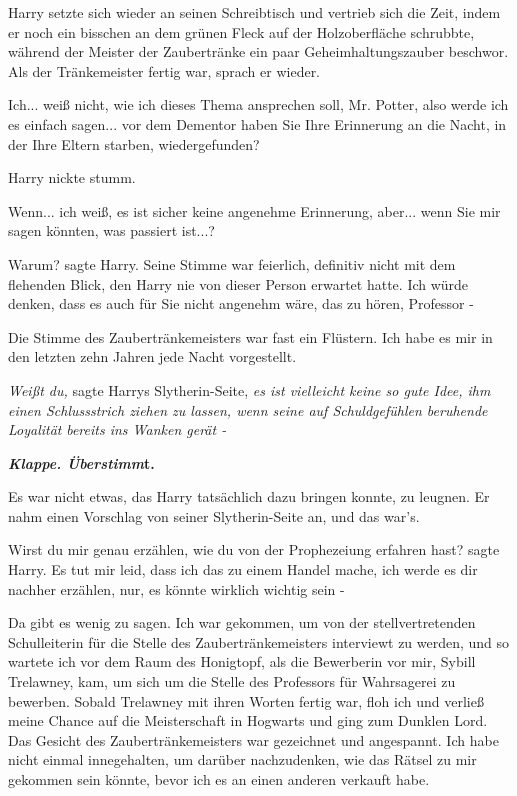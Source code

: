 Harry setzte sich wieder an seinen Schreibtisch und vertrieb sich die Zeit,
indem er noch ein bisschen an dem grünen Fleck auf der Holzoberfläche schrubbte,
während der Meister der Zaubertränke ein paar Geheimhaltungszauber beschwor. Als
der Tränkemeister fertig war, sprach er wieder.

\glqq Ich... weiß nicht, wie ich dieses Thema ansprechen soll, Mr. Potter, also
werde ich es einfach sagen... vor dem Dementor haben Sie Ihre Erinnerung an die
Nacht, in der Ihre Eltern starben, wiedergefunden?\grqq{}

Harry nickte stumm.

\glqq Wenn... ich weiß, es ist sicher keine angenehme Erinnerung, aber... wenn
Sie mir sagen könnten, was passiert ist...?\grqq{}

\glqq Warum?\grqq{} sagte Harry. Seine Stimme war feierlich, definitiv nicht mit
dem flehenden Blick, den Harry nie von dieser Person erwartet hatte. \glqq Ich
würde denken, dass es auch für Sie nicht angenehm wäre, das zu hören, Professor
-\grqq{}

Die Stimme des Zaubertränkemeisters war fast ein Flüstern. \glqq Ich habe es mir
in den letzten zehn Jahren jede Nacht vorgestellt.\grqq{}

\emph{Weißt du, }sagte Harrys Slytherin-Seite, \emph{es ist vielleicht keine so
gute Idee, ihm einen Schlussstrich ziehen zu lassen, wenn seine auf
Schuldgefühlen beruhende Loyalität }\emph{bereits ins Wanken gerät - }

\textbf{\emph{Klappe. Überstimm}}\textbf{t.}

Es war nicht etwas, das Harry tatsächlich dazu bringen konnte, zu leugnen. Er
nahm einen Vorschlag von seiner Slytherin-Seite an, und das war's.

\glqq Wirst du mir genau erzählen, wie du von der Prophezeiung erfahren
hast?\grqq{} sagte Harry. \glqq Es tut mir leid, dass ich das zu einem Handel
mache, ich werde es dir nachher erzählen, nur, es könnte wirklich wichtig sein
-\grqq{}

\glqq Da gibt es wenig zu sagen. Ich war gekommen, um von der stellvertretenden
Schulleiterin für die Stelle des Zaubertränkemeisters interviewt zu werden, und
so wartete ich vor dem Raum des Honigtopf, als die Bewerberin vor mir, Sybill
Trelawney, kam, um sich um die Stelle des Professors für Wahrsagerei zu
bewerben. Sobald Trelawney mit ihren Worten fertig war, floh ich und verließ
meine Chance auf die Meisterschaft in Hogwarts und ging zum Dunklen Lord.\grqq{}
Das Gesicht des Zaubertränkemeisters war gezeichnet und angespannt. \glqq Ich
habe nicht einmal innegehalten, um darüber nachzudenken, wie das Rätsel zu mir
gekommen sein könnte, bevor ich es an einen anderen verkauft habe.\grqq{}

